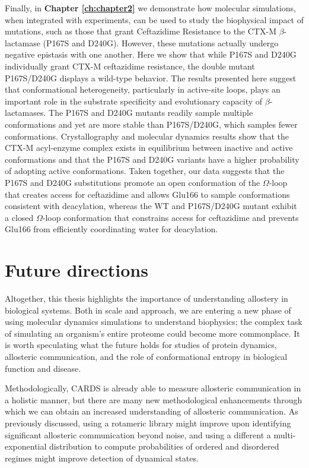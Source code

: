 \documentclass[../main.tex]{subfiles}
\begin{document}
        Finally, in \textbf{Chapter \ref{ch:chapter2}} we demonstrate how molecular simulations, when integrated with experiments, can be used to study the biophysical impact of mutations, such as those that grant Ceftazidime Resistance to the CTX-M $\beta$-lactamase (P167S and D240G). However, these mutations actually undergo negative epistasis with one another. Here we show that while P167S and D240G individually grant CTX-M ceftazidime resistance, the double mutant P167S/D240G displays a wild-type behavior. The results presented here suggest that conformational heterogeneity, particularly in active-site loops, plays an important role in the substrate specificity and evolutionary capacity of $\beta$-lactamases. The P167S and D240G mutants readily sample multiple conformations and yet are more stable than P167S/D240G, which samples fewer conformations. Crystallography and molecular dynamics results show that the CTX-M acyl-enzyme complex exists in equilibrium between inactive and active conformations and that the P167S and D240G variants have a higher probability of adopting active conformations. Taken together, our data suggests that the P167S and D240G substitutions promote an open conformation of the $\Omega$-loop that creates access for ceftazidime and allows Glu166 to sample conformations consistent with deacylation, whereas the WT and P167S/D240G mutant exhibit a closed $\Omega$-loop conformation that constrains access for ceftazidime and prevents Glu166 from efficiently coordinating water for deacylation.
 
    \section{Future directions}
        Altogether, this thesis highlights the importance of understanding allostery in biological systems. Both in scale and approach, we are entering a new phase of using molecular dynamics simulations to understand biophysics; the complex task of simulating an organism’s entire proteome could become more commonplace. It is worth speculating what the future holds for studies of protein dynamics, allosteric communication, and the role of conformational entropy in biological function and disease.
        
        Methodologically, CARDS is already able to measure allosteric communication in a holistic manner, but there are many new methodological enhancements through which we can obtain an increased understanding of allosteric communication. As previously discussed, using a rotameric library might improve upon identifying significant allosteric communication beyond noise, and using a different a multi-exponential distribution to compute probabilities of ordered and disordered regimes might improve detection of dynamical states.
\end{document}
